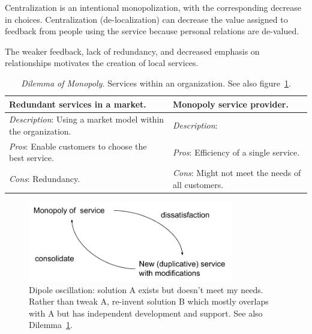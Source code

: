 Centralization is an intentional monopolization, with the corresponding decrease in choices. 
Centralization (de-localization) can decrease the value assigned to feedback from people using the service because personal relations are de-valued. 

The weaker feedback, lack of redundancy, and decreased emphasis on relationships motivates the creation of local services. 


\begin{center}
\begin{table}[H] %
\begin{tabular}{ | m{\dilemmatablewidth}| m{\dilemmatablewidth} | } 
  \hline
  \textbf{Redundant services in a market.} &
  \textbf{Monopoly service provider.} \\
  \hline
  \textit{Description}: Using a market model within the organization. &
  \textit{Description}:  \\  
  \hline
  \textit{Pros}: Enable customers to choose the best service. &
  \textit{Pros}: Efficiency of a single service. \\
  \hline
  \textit{Cons}: Redundancy. & 
  \textit{Cons}: Might not meet the needs of all customers. \\
  \hline
\end{tabular}
\caption{
\textit{Dilemma of Monopoly.}
Services within an organization. See also figure~\ref{fig:market-vs-monopoly}.
}
\label{table:dilemma-org-market-vs-monopoly}
\end{table}
\end{center}


\begin{figure}[H] %
    \centering
    \includegraphics[width=0.8\textwidth]{images/dilemma_market_vs_monopoly.pdf}
    \caption{Dipole oscillation: solution A exists but doesn't meet my needs. Rather than tweak A, re-invent solution B which mostly overlaps with A but has independent development and support. See also Dilemma~\ref{table:dilemma-org-market-vs-monopoly}.}
    \label{fig:market-vs-monopoly}
\end{figure}

